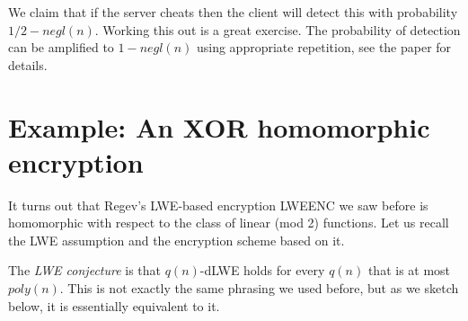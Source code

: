 We claim that if the server cheats then the client will detect this with
probability \(1/2 - negl(n)\). Working this out is a great exercise. The
probability of detection can be amplified to \(1-negl(n)\) using
appropriate repetition, see the paper for details.

\section{Example: An XOR homomorphic
encryption}\label{Example-An-XOR-homomorphi}

It turns out that Regev's LWE-based encryption LWEENC we saw before is
homomorphic with respect to the class of linear (mod 2) functions. Let
us recall the LWE assumption and the encryption scheme based on it.

\hypertarget{LWEdef}{}

The \emph{LWE conjecture} is that \(q(n)\)-dLWE holds for every \(q(n)\)
that is at most \(poly(n)\). This is not exactly the same phrasing we
used before, but as we sketch below, it is essentially equivalent to it.


